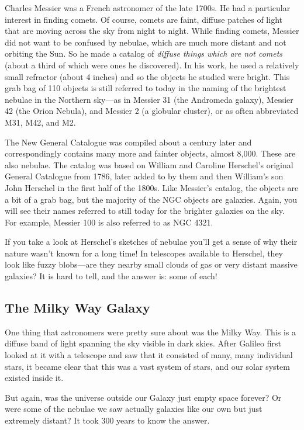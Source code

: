 \documentclass[12pt, preprint]{aastex}
\begin{document}
Charles Messier was a French astronomer of the late 1700s. He had a
particular interest in finding comets. Of course, comets are faint,
diffuse patches of light that are moving across the sky from night to
night. While finding comets, Messier did not want to be confused by
nebulae, which are much more distant and not orbiting the Sun. So he
made a catalog of {\it diffuse things which are not comets} (about a
third of which were ones he discovered). In his work, he used a
relatively small refractor (about 4 inches) and so the objects he
studied were bright. This grab bag of 110 objects is still referred to
today in the naming of the brightest nebulae in the Northern sky---as
in Messier 31 (the Andromeda galaxy), Messier 42 (the Orion Nebula),
and Messier 2 (a globular cluster), or as often abbreviated M31, M42,
and M2.

The New General Catalogue was compiled about a century later and
correspondingly contains many more and fainter objects, almost
8,000. These are also nebulae. The catalog was based on William and
Caroline Herschel's original General Catalogue from 1786, later added
to by them and then William's son John Herschel in the first half of
the 1800s. Like Messier's catalog, the objects are a bit of a grab
bag, but the majority of the NGC objects are galaxies. Again, you will
see their names referred to still today for the brighter galaxies on
the sky. For example, Messier 100 is also referred to as NGC 4321.

If you take a look at Herschel's sketches of nebulae you'll get a
sense of why their nature wasn't known for a long time! In telescopes
available to Herschel, they look like fuzzy blobs---are they nearby
small clouds of gas or very distant massive galaxies? It is hard to
tell, and the answer is: some of each!

\subsection{The Milky Way Galaxy}

One thing that astronomers were pretty sure about was the Milky
Way. This is a diffuse band of light spanning the sky visible in dark
skies. After Galileo first looked at it with a telescope and saw that
it consisted of many, many individual stars, it became clear that this
was a vast system of stars, and our solar system existed inside it.

But again, was the universe outside our Galaxy just empty space
forever? Or were some of the nebulae we saw actually galaxies like our
own but just extremely distant? It took 300 years to know the answer.
\end{document}
